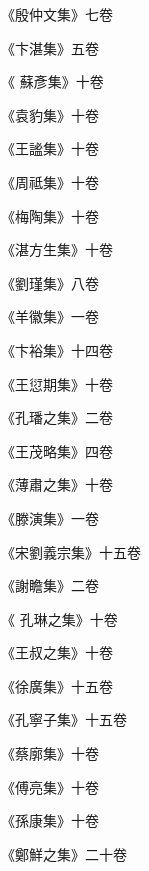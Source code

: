 \begin{pinyinscope}
 《殷仲文集》七卷



 《卞湛集》五卷



 《
 蘇彥集》十卷



 《袁豹集》十卷



 《王謐集》十卷



 《周祗集》十卷



 《梅陶集》十卷



 《湛方生集》十卷



 《劉瑾集》八卷



 《羊徽集》一卷



 《卞裕集》十四卷



 《王愆期集》十卷



 《孔璠之集》二卷



 《王茂略集》四卷



 《薄肅之集》十卷



 《滕演集》一卷



 《宋劉義宗集》十五卷



 《謝瞻集》二卷



 《
 孔琳之集》十卷



 《王叔之集》十卷



 《徐廣集》十五卷



 《孔寧子集》十五卷



 《蔡廓集》十卷



 《傅亮集》十卷



 《孫康集》十卷



 《鄭鮮之集》二十卷




\end{pinyinscope}

